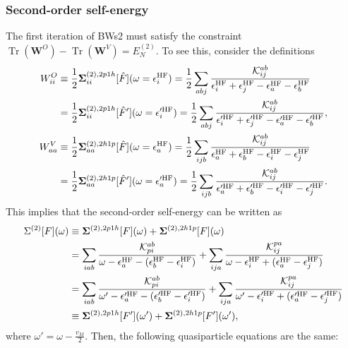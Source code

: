 \subsubsection{Second-order self-energy}
The first iteration of BWs2 must satisfy the constraint $\operatorname{Tr}(\mathbf{W}^{O}) - \operatorname{Tr}(\mathbf{W}^{V}) = E^{(2)}_N$. To see this, consider the definitions
\begin{align}
{W}^{O}_{ii} &\equiv \frac{1}{2}\bm{\Sigma}_{ii}^{(2),2p1h}[\hat F](\omega = \epsilon_i^{\rm HF}) = \frac{1}{2}\sum_{a b j} \frac{\mathcal{K}_{ij}^{ab}}{\epsilon^{\rm HF}_i + \epsilon^{\rm HF}_j - \epsilon^{\rm HF}_a - \epsilon^{\rm HF}_b}\\
&= \frac{1}{2}\bm{\Sigma}_{ii}^{(2),2p1h}[\hat F'](\omega = \epsilon'^{\rm HF}_i) =\frac{1}{2}\sum_{a b j} \frac{\mathcal{K}_{ij}^{ab}}{\epsilon'^{\rm HF}_i + \epsilon'^{\rm HF}_j - \epsilon'^{\rm HF}_a - \epsilon'^{\rm HF}_b},\\
{W}^{V}_{aa} &\equiv \frac{1}{2}\bm{\Sigma}_{aa}^{(2),2h1p}[\hat F](\omega = \epsilon^{\rm HF}_a)= \frac{1}{2}\sum_{i j b} \frac{\mathcal{K}_{ij}^{ab}}{\epsilon^{\rm HF}_a + \epsilon^{\rm HF}_b - \epsilon^{\rm HF}_i - \epsilon^{\rm HF}_j}\\
&= \frac{1}{2}\bm{\Sigma}_{aa}^{(2),2h1p}[\hat F'](\omega = \epsilon'^{\rm HF}_a) = \frac{1}{2}\sum_{i j b} \frac{\mathcal{K}_{ij}^{ab}}{\epsilon'^{\rm HF}_a + \epsilon'^{\rm HF}_b - \epsilon'^{\rm HF}_i - \epsilon'^{\rm HF}_j}.
\end{align}
This implies that the second-order self-energy can be written as
\begin{align}
  \Sigma^{(2)}[F](\omega)&\equiv \bm{\Sigma}^{(2),2p1h}[F](\omega) + \bm{\Sigma}^{(2),2h1p}[F](\omega)  \\
&= \sum_{ia b} \frac{\mathcal{K}_{pi}^{ab}}{\omega - \epsilon^{\rm HF}_a - (\epsilon^{\rm HF}_b-\epsilon^{\rm HF}_i)} + \sum_{i j a} \frac{\mathcal{K}_{ij}^{pa}}{\omega-\epsilon^{\rm HF}_i + (\epsilon^{\rm HF}_a - \epsilon^{\rm HF}_j)}\\
&= \sum_{ia b} \frac{\mathcal{K}_{pi}^{ab}}{\omega' - \epsilon'^{\rm HF}_a - (\epsilon'^{\rm HF}_b-\epsilon'^{\rm HF}_i)} + \sum_{i j a} \frac{\mathcal{K}_{ij}^{pa}}{\omega'-\epsilon'^{\rm HF}_i + (\epsilon'^{\rm HF}_a - \epsilon'^{\rm HF}_j)}\label{eq:second_order_self_energy}\\
&\equiv \bm{\Sigma}^{(2),2p1h}[F'](\omega') + \bm{\Sigma}^{(2),2h1p}[F'](\omega'),
\end{align}
where $\omega' = \omega - \frac{v_M}{2}$.
Then, the following quasiparticle equations are the same:
